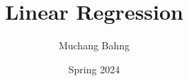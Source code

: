 \documentclass{article}
\begin{document}
\title{Linear Regression}
\author{Muchang Bahng}
\date{Spring 2024}

\maketitle
\tableofcontents
\pagebreak



 
 
 
 
 
 



\end{document}
